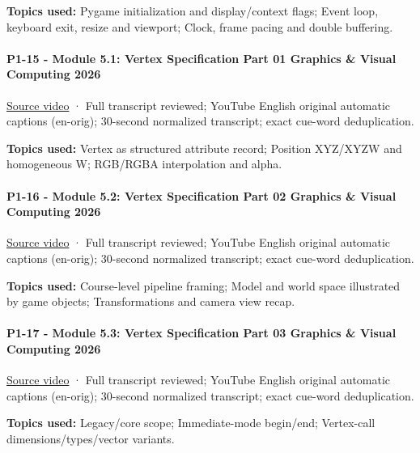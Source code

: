 \textbf{Topics used:} Pygame initialization and display/context flags; Event loop, keyboard exit, resize and viewport; Clock, frame pacing and double buffering.

\paragraph{P1-15 - Module 5.1: Vertex Specification Part 01 Graphics \& Visual Computing 2026}\label{p1-15---module-5.1-vertex-specification-part-01-graphics-visual-computing-2026}

\href{https://www.youtube.com/watch?v=llQ74GoG1po}{Source video} · Full transcript reviewed; YouTube English original automatic captions (en-orig); 30-second normalized transcript; exact cue-word deduplication.

\textbf{Topics used:} Vertex as structured attribute record; Position XYZ/XYZW and homogeneous W; RGB/RGBA interpolation and alpha.

\paragraph{P1-16 - Module 5.2: Vertex Specification Part 02 Graphics \& Visual Computing 2026}\label{p1-16---module-5.2-vertex-specification-part-02-graphics-visual-computing-2026}

\href{https://www.youtube.com/watch?v=wl-w5PZfmII}{Source video} · Full transcript reviewed; YouTube English original automatic captions (en-orig); 30-second normalized transcript; exact cue-word deduplication.

\textbf{Topics used:} Course-level pipeline framing; Model and world space illustrated by game objects; Transformations and camera view recap.

\paragraph{P1-17 - Module 5.3: Vertex Specification Part 03 Graphics \& Visual Computing 2026}\label{p1-17---module-5.3-vertex-specification-part-03-graphics-visual-computing-2026}

\href{https://www.youtube.com/watch?v=QGwjwKvDF0I}{Source video} · Full transcript reviewed; YouTube English original automatic captions (en-orig); 30-second normalized transcript; exact cue-word deduplication.

\textbf{Topics used:} Legacy/core scope; Immediate-mode begin/end; Vertex-call dimensions/types/vector variants.

